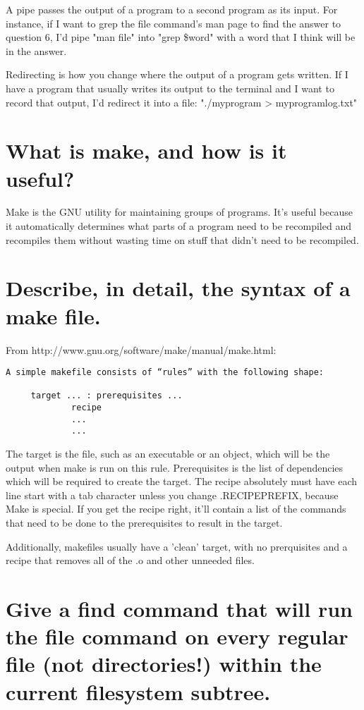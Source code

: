 \documentclass[10pt]{article}
\begin{document}
A pipe passes the output of a program to a second program as its input. For
instance, if I want to grep the file command's man page to find the answer to
question 6, I'd pipe "man file" into "grep \$word" with a word that I think
will be in the answer. 

Redirecting is how you change where the output of a program gets written. If I have
a program that usually writes its output to the terminal and  I want to record
that output, I'd redirect it into a file: "./myprogram > myprogramlog.txt"

\section{What is make, and how is it useful?}

Make is the GNU utility for maintaining groups of programs. It's useful
because it automatically determines what parts of a program need to be
recompiled and recompiles them without wasting time on stuff that didn't need
to be recompiled. 

\section{Describe, in detail, the syntax of a make file.}

From http://www.gnu.org/software/make/manual/make.html: 

\begin{verbatim}
A simple makefile consists of “rules” with the following shape:

     target ... : prerequisites ...
             recipe
             ...
             ...
\end{verbatim}

The target is the file, such as an executable or an object, which will be the
output when make is run on this rule. Prerequisites is the list of
dependencies which will be required to create the target. The recipe
absolutely must have each line start with a tab character unless you change
.RECIPEPREFIX, because Make is special. If you get the recipe right, it'll
contain a list of the commands that need to be done to the prerequisites to
result in the target. 

Additionally, makefiles usually have a 'clean' target, with no prerquisites
and a recipe that removes all of the .o and other unneeded files. 

\section{Give a find command that will run the file command on every regular file (not
directories!) within the current filesystem subtree.}
\end{document}
